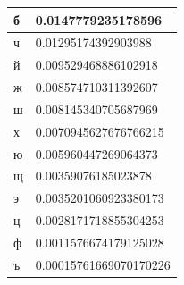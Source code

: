 \begin{table}[]
\begin{tabular}{ll}
\multicolumn{1}{|l|}{б} & \multicolumn{1}{l|}{0.0147779235178596}     \\ \hline
\multicolumn{1}{|l|}{ч} & \multicolumn{1}{l|}{0.01295174392903988}    \\ \hline
\multicolumn{1}{|l|}{й} & \multicolumn{1}{l|}{0.009529468886102918}   \\ \hline
\multicolumn{1}{|l|}{ж} & \multicolumn{1}{l|}{0.008574710311392607}   \\ \hline
\multicolumn{1}{|l|}{ш} & \multicolumn{1}{l|}{0.008145340705687969}   \\ \hline
\multicolumn{1}{|l|}{х} & \multicolumn{1}{l|}{0.0070945627676766215}  \\ \hline
\multicolumn{1}{|l|}{ю} & \multicolumn{1}{l|}{0.005960447269064373}   \\ \hline
\multicolumn{1}{|l|}{щ} & \multicolumn{1}{l|}{0.00359076185023878}    \\ \hline
\multicolumn{1}{|l|}{э} & \multicolumn{1}{l|}{0.0035201060923380173}  \\ \hline
\multicolumn{1}{|l|}{ц} & \multicolumn{1}{l|}{0.0028171718855304253}  \\ \hline
\multicolumn{1}{|l|}{ф} & \multicolumn{1}{l|}{0.0011576674179125028}  \\ \hline
\multicolumn{1}{|l|}{ъ} & \multicolumn{1}{l|}{0.00015761669070170226} \\ \hline
\end{tabular}
\end{table}



